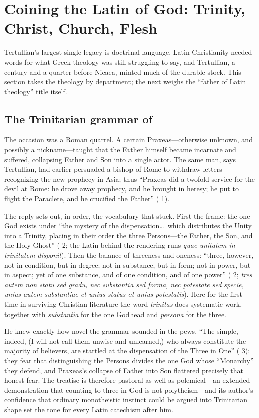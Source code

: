 \section{Coining the Latin of God: Trinity, Christ, Church, Flesh}

Tertullian's largest single legacy is doctrinal language. Latin Christianity
needed words for what Greek theology was still struggling to say, and
Tertullian, a century and a quarter before Nicaea, minted much of the durable
stock. This section takes the theology by department; the next weighs the
``father of Latin theology'' title itself.

\subsection{The Trinitarian grammar of }

The occasion was a Roman quarrel. A certain Praxeas---otherwise unknown, and
possibly a nickname---taught that the Father himself became incarnate and
suffered, collapsing Father and Son into a single actor. The same man, says
Tertullian, had earlier persuaded a bishop of Rome to withdraw letters
recognizing the new prophecy in Asia; thus ``Praxeas did a twofold service for
the devil at Rome: he drove away prophecy, and he brought in heresy; he put to
flight the Paraclete, and he crucified the Father'' ( 1).

The reply sets out, in order, the vocabulary that stuck. First the frame: the
one God exists under ``the mystery of the dispensation\ldots\ which
distributes the Unity into a Trinity, placing in their order the three
Persons---the Father, the Son, and the Holy Ghost'' (
2; the Latin behind the rendering runs \textit{quae unitatem in trinitatem
disponit}). Then the balance of threeness and oneness: ``three, however, not
in condition, but in degree; not in substance, but in form; not in power, but
in aspect; yet of one substance, and of one condition, and of one power''
( 2; \textit{tres autem non statu sed gradu, nec
substantia sed forma, nec potestate sed specie, unius autem substantiae et
unius status et unius potestatis}). Here for the first time in surviving
Christian literature the word \textit{trinitas} does systematic work, together
with \textit{substantia} for the one Godhead and \textit{persona} for the
three.

He knew exactly how novel the grammar sounded in the pews. ``The simple,
indeed, (I will not call them unwise and unlearned,) who always constitute
the majority of believers, are startled at the dispensation of the Three in
One'' ( 3): they fear that distinguishing the Persons
divides the one God whose ``Monarchy'' they defend, and Praxeas's collapse of
Father into Son flattered precisely that honest fear. The treatise is
therefore pastoral as well as polemical---an extended demonstration that
counting to three in God is not polytheism---and its author's confidence
that ordinary monotheistic instinct could be argued into Trinitarian shape
set the tone for every Latin catechism after him.

